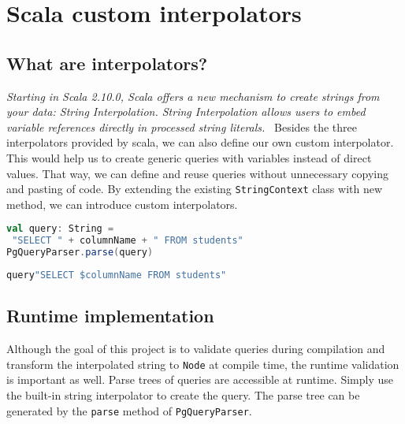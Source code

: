 \section{Scala custom interpolators}
\subsection{What are interpolators?}
\textit{Starting in Scala 2.10.0, Scala offers a new mechanism to create strings from your data: String Interpolation. String Interpolation allows users to embed variable references directly in processed string literals.}~\cite{String interpolation} Besides the three interpolators provided by scala, we can also define our own custom interpolator. This would help us to create generic queries with variables instead of direct values. That way, we can define and reuse queries without unnecessary copying and pasting of code. By extending the existing \texttt{StringContext} class with new method, we can introduce custom interpolators. 
\bigskip
\newline
\begin{lstlisting}[language=scala, basicstyle=\ttfamily, showstringspaces=false, caption={Example of \texttt{String} concatenation}]
val query: String = 
 "SELECT " + columnName + " FROM students"
PgQueryParser.parse(query)
\end{lstlisting}
\bigskip
\begin{lstlisting}[language=scala, basicstyle=\ttfamily, showstringspaces=false, caption={Example of custom interpolation}]
query"SELECT $columnName FROM students"
\end{lstlisting}

\subsection{Runtime implementation}
Although the goal of this project is to validate queries during compilation and transform the interpolated string to \texttt{Node} at compile time, the runtime validation is important as well. Parse trees of queries are accessible at runtime. Simply use the built-in string interpolator to create the query. The parse tree can be generated by the \texttt{parse} method of \texttt{PgQueryParser}.